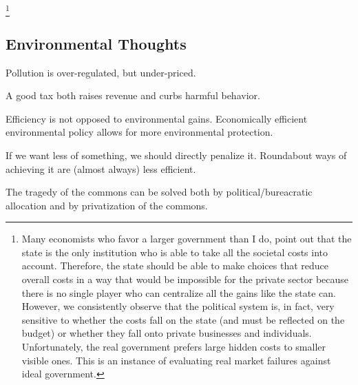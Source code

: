 \footnote{Many economists who favor a larger government than I do, point out
that the state is the only institution who is able to take all the societal
costs into account. Therefore, the state should be able to make choices that
reduce overall costs in a way that would be impossible for the private sector
because there is no single player who can centralize all the gains like the
state can. However, we consistently observe that the political system is, in
fact, very sensitive to whether the costs fall on the state (and must be
reflected on the budget) or whether they fall onto private businesses and
individuals. Unfortunately, the real government prefers large hidden costs to
smaller visible ones. This is an instance of evaluating real market failures
against ideal government.}

\subsection{Environmental Thoughts}

\thought Pollution is over-regulated, but under-priced.

\thought A good tax both raises revenue and curbs harmful behavior.

\thought Efficiency is not opposed to environmental gains. Economically
efficient environmental policy allows for more environmental protection.

\thought If we want less of something, we should directly penalize it.
Roundabout ways of achieving it are (almost always) less efficient.

\thought The tragedy of the commons can be solved both by political/bureacratic
allocation and by privatization of the commons.

